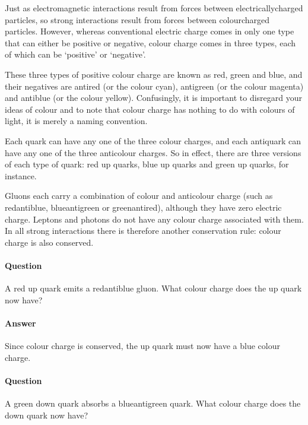\documentclass[letterpaper,10pt,english]{sphinxmanual}
\begin{document}
Just as electromagnetic interactions result from forces between electrically\sphinxhyphen{}charged particles, so strong interactions result from forces between colour\sphinxhyphen{}charged particles. However, whereas conventional electric charge comes in only one type that can either be positive or negative, colour charge comes in three types, each of which can be ‘positive’ or ‘negative’.

These three types of positive colour charge are known as red, green and blue, and their negatives are antired (or the colour cyan), antigreen (or the colour magenta) and antiblue (or the colour yellow). Confusingly, it is important to disregard your ideas of colour and to note that colour charge has nothing to do with colours of light, it is merely a naming convention.

Each quark can have any one of the three colour charges, and each antiquark can have any one of the three anticolour charges. So in effect, there are three versions of each type of quark: red up quarks, blue up quarks and green up quarks, for instance.

Gluons each carry a combination of colour and anticolour charge (such as red\textendash{}antiblue, blue\textendash{}antigreen or green\textendash{}antired), although they have zero electric charge. Leptons and photons do not have any colour charge associated with them. In all strong interactions there is therefore another conservation rule: colour charge is also conserved.


\paragraph{Question}
\label{\detokenize{content/session_00/Part_00_06:Question}}
A red up quark emits a red\sphinxhyphen{}antiblue gluon. What colour charge does the up quark now have?


\paragraph{Answer}
\label{\detokenize{content/session_00/Part_00_06:Answer}}
Since colour charge is conserved, the up quark must now have a blue colour charge.


\paragraph{Question}
\label{\detokenize{content/session_00/Part_00_06:id1}}
A green down quark absorbs a blue\sphinxhyphen{}antigreen quark. What colour charge does the down quark now have?
\end{document}
